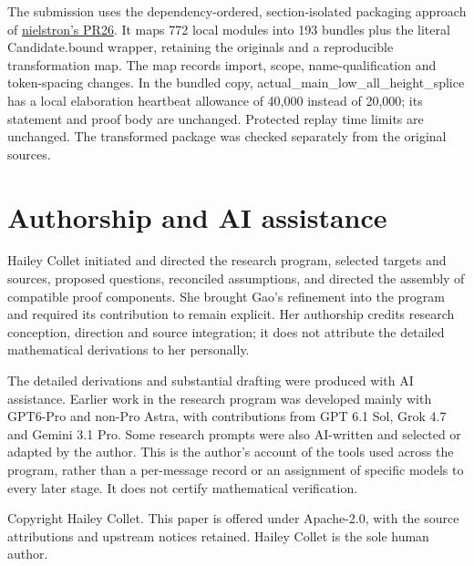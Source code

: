 \documentclass[11pt,a4paper]{article}
\newcommand{\sourcecode}[1]{{\small\ttfamily #1}}
\begin{document}
The submission uses the dependency-ordered, section-isolated packaging
approach of \href{https://github.com/GTimG/QuasiRiemannTracker/pull/26}{nielstron's PR26}.
It maps 772 local modules into 193 bundles plus the literal
\sourcecode{Candidate.\allowbreak{}bound} wrapper, retaining the originals
and a reproducible transformation map. The map records import, scope,
name-qualification and token-spacing changes. In the bundled copy,
\sourcecode{actual\_\allowbreak{}main\_\allowbreak{}low\_\allowbreak{}all\_\allowbreak{}height\_\allowbreak{}splice}
has a local elaboration heartbeat allowance of 40,000 instead of 20,000;
its statement and proof body are unchanged. Protected replay time limits
are unchanged. The transformed package was checked separately from the original sources.

\hypertarget{authorship-and-ai-assistance}{%
\section{Authorship and AI
assistance}\label{authorship-and-ai-assistance}}

Hailey Collet initiated and directed the research program, selected
targets and sources, proposed questions, reconciled assumptions, and
directed the assembly of compatible proof components. She brought Gao's
refinement into the program and required its contribution to remain
explicit. Her authorship credits research conception, direction and
source integration; it does not attribute the detailed mathematical
derivations to her personally.

The detailed derivations and substantial drafting were produced with AI
assistance. Earlier work in the research program was developed mainly
with GPT6-Pro and non-Pro Astra, with contributions from GPT 6.1 Sol,
Grok 4.7 and Gemini 3.1 Pro. Some research prompts were also AI-written
and selected or adapted by the author. This is the author's account of
the tools used across the program, rather than a per-message record or
an assignment of specific models to every later stage. It does not
certify mathematical verification.

Copyright Hailey Collet. This paper is offered under Apache-2.0, with
the source attributions and upstream notices retained. Hailey Collet is
the sole human author.
\end{document}
